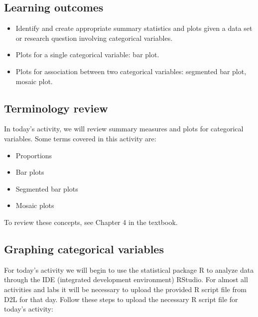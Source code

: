 \documentclass[
]{report}
\begin{document}

\hypertarget{learning-outcomes-4}{%
\subsection{Learning outcomes}\label{learning-outcomes-4}}

\begin{itemize}
\item
  Identify and create appropriate summary statistics and plots given a data set or research question involving categorical variables.
\item
  Plots for a single categorical variable: bar plot.
\item
  Plots for association between two categorical variables:
  segmented bar plot, mosaic plot.
\end{itemize}

\hypertarget{terminology-review-4}{%
\subsection{Terminology review}\label{terminology-review-4}}

In today's activity, we will review summary measures and plots for categorical variables. Some terms covered in this activity are:

\begin{itemize}
\item
  Proportions
\item
  Bar plots
\item
  Segmented bar plots
\item
  Mosaic plots
\end{itemize}

To review these concepts, see Chapter 4 in the textbook.

\hypertarget{graphing-categorical-variables}{%
\subsection{Graphing categorical variables}\label{graphing-categorical-variables}}

For today's activity we will begin to use the statistical package R to analyze data through the IDE (integrated development environment) RStudio. For almost all activities and labs it will be necessary to upload the provided R script file from D2L for that day. Follow these steps to upload the necessary R script file for today's activity:
\end{document}
